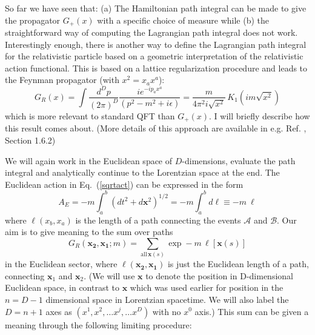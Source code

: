 \documentclass{article}
\def\eq#1{{Eq.~(\ref{#1})}}
\begin{document}
So far we have seen that: (a) The Hamiltonian path integral can be made to give the propagator $G_+(x)$ with a specific choice of measure while (b) the straightforward way of computing the Lagrangian path integral does not work.
Interestingly enough, there is another way to define the Lagrangian path integral for the relativistic particle based on a geometric interpretation of the relativistic  action functional. This is based on  a lattice regularization procedure and leads to the Feynman propagator (with $x^2=x_ax^a$):
 \begin{equation}
G_R(x)=\int \frac{d^Dp}{(2\pi)^D}\frac{ie^{-ip_ax^a}}{(p^2-m^2+i\epsilon)}
 =\frac{m}{4\pi^2 i \sqrt{x^2}} \, K_1(im\sqrt{x^2})
\label{gfinft}
\end{equation} 
which is more relevant to standard QFT than  $G_+(x)$. I will briefly describe how this result comes about. (More details of this approach are available in e.g. Ref. \cite{tpqft}, Section 1.6.2)

 We will again work  in the Euclidean space of $D$-dimensions, evaluate the path integral and analytically continue to the Lorentzian space at the end.
The Euclidean action in \eq{sqrtact} can be expressed in the form 
\begin{equation}
 A_E = - m \int_a^b (dt^2+ d\bm{x}^2)^{1/2} = - m \int_a^b d\ell \equiv - m\  \ell 
\end{equation} 
where $\ell(x_b,x_a)$ is the length of a path connecting the events $\mathcal{A}$ and $\mathcal{B}$.  
 Our aim is  to give meaning to the sum over paths
\begin{equation} 
G_R(\mathbf{ x_2, x_1};m)=
\sum_{\mathrm{all}\,{\mathbf x}(s)}\exp
-m\,\ell[\mathbf{ x}(s)] 
\label{qlat}
\end{equation} 
in the Euclidean sector, where
$
 \ell(\mathbf{ x_2,x_1})
$ 
is just the Euclidean length of a path, connecting
${\mathbf x}_1$ and ${\mathbf x}_2$. (We will use $\mathbf{x}$ to denote the position in D-dimensional Euclidean space, in contrast to $\bm{x}$ which was used earlier for position in the $n=D-1$ dimensional space in Lorentzian spacetime. We will also label the $D=n+1$ axes as $(x^1, x^2, \ldots x^j, \ldots x^D)$ with no $x^0$ axis.)
This sum can be given a meaning through the following limiting procedure:
\end{document}
